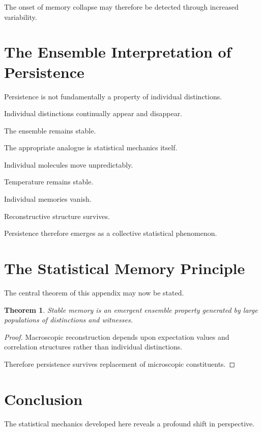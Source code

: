 \documentclass[12pt,oneside]{book}
\theoremstyle{plain} \newtheorem{theorem}{Theorem}[chapter] \newtheorem{lemma}[theorem]{Lemma} \newtheorem{proposition}[theorem]{Proposition} \newtheorem{corollary}[theorem]{Corollary}
\theoremstyle{definition} \newtheorem{definition}[theorem]{Definition} \newtheorem{axiom}[theorem]{Axiom} \newtheorem{construction}[theorem]{Construction}
\theoremstyle{remark} \newtheorem{remark}[theorem]{Remark} \newtheorem{example}[theorem]{Example}
\begin{document}
The onset of memory collapse may therefore be detected through increased variability.

\section{The Ensemble Interpretation of Persistence}

Persistence is not fundamentally a property of individual distinctions.

Individual distinctions continually appear and disappear.

The ensemble remains stable.

The appropriate analogue is statistical mechanics itself.

Individual molecules move unpredictably.

Temperature remains stable.

Individual memories vanish.

Reconstructive structure survives.

Persistence therefore emerges as a collective statistical phenomenon.

\section{The Statistical Memory Principle}

The central theorem of this appendix may now be stated.

\begin{theorem}

Stable memory is an emergent ensemble property generated by large populations of distinctions and witnesses.

\end{theorem}

\begin{proof}

Macroscopic reconstruction depends upon expectation values and correlation structures rather than individual distinctions.

Therefore persistence survives replacement of microscopic constituents.

\end{proof}

\section{Conclusion}

The statistical mechanics developed here reveals a profound shift in perspective.
\end{document}
